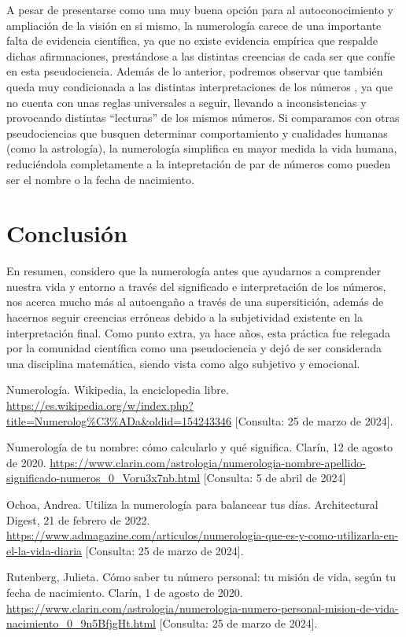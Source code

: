 \documentclass{article}
\begin{document}
	A pesar de presentarse como una muy buena opción para al autoconocimiento y ampliación de la visión en si mismo, la numerología carece de una importante falta de evidencia científica, ya que no existe evidencia empírica que respalde dichas afirmnaciones, prestándose a las distintas creencias de cada ser que confíe en esta pseudociencia. Además de lo anterior, podremos observar que también queda muy condicionada a las distintas interpretaciones de los números \cite{ochoa}, ya que no cuenta con unas reglas universales a seguir, llevando a inconsistencias y provocando distintas “lecturas” de los mismos números.	Si comparamos con otras pseudociencias que busquen determinar comportamiento y cualidades humanas (como la astrología), la numerología simplifica en mayor medida la vida humana, reduciéndola completamente a la intepretación de par de números como pueden ser el nombre o la fecha de nacimiento.
	
	\section*{Conclusión}
	
	En resumen, considero que la numerología antes que ayudarnos a comprender nuestra vida y entorno a través del significado e interpretación de los números, nos acerca mucho más al autoengaño a través de una supersitición, además de hacernos seguir creencias erróneas debido a la subjetividad existente en la interpretación final. Como punto extra, ya hace años, esta práctica fue relegada por la comunidad científica como una pseudociencia y dejó de ser considerada una disciplina matemática, siendo vista como algo subjetivo y emocional.\cite{wikipedia}\\
	
	\newpage
	
	\begin{thebibliography}{99}
		
		Numerología.
		Wikipedia, la enciclopedia libre.
		\url{https://es.wikipedia.org/w/index.php?title=Numerolog%C3%ADa&oldid=154243346}
		[Consulta: 25 de marzo de 2024].
		
		Numerología de tu nombre: cómo calcularlo y qué significa.
		Clarín, 12 de agosto de 2020.
		\url{https://www.clarin.com/astrologia/numerologia-nombre-apellido-significado-numeros_0_Voru3x7nb.html}
		[Consulta: 5 de abril de 2024]
		
		Ochoa, Andrea.
		Utiliza la numerología para balancear tus días.
		Architectural Digest, 21 de febrero de 2022.
		\url{https://www.admagazine.com/articulos/numerologia-que-es-y-como-utilizarla-en-el-la-vida-diaria}
		[Consulta: 25 de marzo de 2024].
		
		Rutenberg, Julieta.
		Cómo saber tu número personal: tu misión de vida, según tu fecha de nacimiento.
		Clarín, 1 de agosto de 2020.
		\url{https://www.clarin.com/astrologia/numerologia-numero-personal-mision-de-vida-nacimiento_0_9n5BfjgHt.html}
		[Consulta: 25 de marzo de 2024].
		
	\end{thebibliography}
\end{document}
